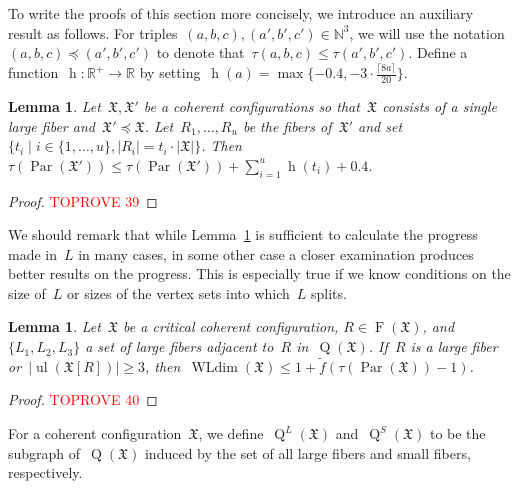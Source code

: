 \documentclass[english,a4paper]{article}
\theoremstyle{plain}
\newtheorem{lemma}      [theorem]{Lemma}
\theoremstyle{definition}
\newcommand{\Nat}{\ensuremath{\mathbb{N}}}
\newcommand{\Rel}{\ensuremath{\mathbb{R}}}
\DeclareMathOperator{\Fibers}{F}
\newcommand{\coherentConfig}{\ensuremath{\mathfrak{X}}}
\newcommand{\fibers}[1]{\ensuremath{\Fibers \left( #1 \right)}}
\newcommand{\inducedCC}[1]{\ensuremath{\coherentConfig[#1]}}
\DeclareMathOperator*{\ul}{ul}
\DeclareMathOperator*{\WLdim}{WLdim}
\newcommand{\wldim}[1]{\ensuremath{\WLdim\left(#1\right)}}
\newcommand{\finer}{\preccurlyeq}
\DeclareMathOperator*{\Quotient}{Q}
\newcommand{\quotientGraph}[1]{\ensuremath{\Quotient(#1)}}
\newcommand{\quotientGraphLarge}[1]{\ensuremath{\Quotient^L(#1)}}
\newcommand{\quotientGraphSmall}[1]{\ensuremath{\Quotient^S(#1)}}
\newcommand{\f}{f}
\DeclareMathOperator{\hfunction}{h}
\DeclareMathOperator{\parameters}{Par}
\begin{document}
To write the proofs of this section more concisely, we introduce an auxiliary result as follows.
For triples~$(a,b,c),(a',b',c')\in \Nat^3$, we will use the notation~$(a,b,c)\preceq (a',b',c')$ to denote that~$\tau(a,b,c)\leq \tau(a',b',c')$.
Define a function~$\hfunction\colon \Rel^+\rightarrow \Rel$
by setting~$\hfunction(a)= \max\{-0.4,-3\cdot \frac{\lceil 8a\rceil }{20}\}$.










\begin{lemma}
\label{local:progress-in-large/lem}
    Let~$\coherentConfig, \coherentConfig'$ be a coherent configurations so that~$\coherentConfig$ consists of a single large fiber and~$\coherentConfig'\finer \coherentConfig$.
    Let~$R_1,\ldots,R_u$ be the fibers of~$\coherentConfig'$ and set~$\{t_i \mid i \in\{1,\ldots,u\}, |R_i|= t_i \cdot|\coherentConfig| \}$.
    Then~$\tau(\parameters(\coherentConfig'))\leq \tau(\parameters(\coherentConfig'))+\sum_{i = 1}^{u} \hfunction(t_i)+0.4$.
\end{lemma}
\begin{proof}\textcolor{red}{TOPROVE 39}\end{proof}

We should remark that while Lemma~\ref{local:progress-in-large/lem} is sufficient to calculate the progress made in~$L$ in many cases, in some other case a closer examination produces better results on the progress.
This is especially true if we know conditions on the size of~$L$ or sizes of the vertex sets into which~$L$ splits.










\begin{lemma}
    \label{lem:local-argument:3-large-neighbors}
    Let~$\coherentConfig$ be a critical coherent configuration, $R \in \fibers{\coherentConfig}$, and~$\{L_1,L_2,L_3\}$ a set of large fibers adjacent to~$R$ in~$\quotientGraph{\coherentConfig}$.
    If~$R$ is a large fiber or~$|\ul(\inducedCC{R})| \geq 3$, then~$\wldim{\coherentConfig} \leq 1 + \widetilde{\f}( \tau(\parameters(\coherentConfig)) - 1)$.
\end{lemma}
\begin{proof}\textcolor{red}{TOPROVE 40}\end{proof}


For a coherent configuration~$\coherentConfig$, we define~$\quotientGraphLarge{\coherentConfig}$ and~$\quotientGraphSmall{\coherentConfig}$ to be the subgraph of~$\quotientGraph{\coherentConfig}$ induced by the set of all large fibers and small fibers, respectively.
\end{document}
